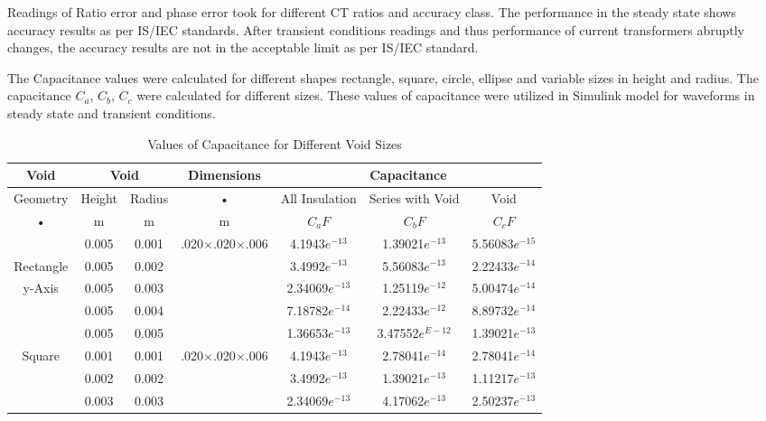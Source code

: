 Readings of Ratio error and phase error took for different CT ratios and accuracy class. The performance in the steady state shows accuracy results as per IS/IEC standards. After transient conditions readings and thus performance of current transformers abruptly changes, the accuracy results are not in the acceptable limit as per IS/IEC standard.

The Capacitance values were calculated for different shapes rectangle, square, circle, ellipse and variable sizes in height and radius. The capacitance $C_a$, $C_b$, $C_c$ were calculated for different sizes. These values of capacitance were utilized in Simulink model for waveforms in steady state and transient conditions.

\begin{table}[h!]
\caption{Values of Capacitance for Different Void Sizes}
\label{table:Values of Capacitance for Different Void Sizes}
\centering
\small
\begin{tabular}{|c|c|c|c|c|c|c|}
\hline 
Void & \multicolumn{2}{c|}{Void} & Dimensions & \multicolumn{3}{c|}{Capacitance}  \\ 
\hline 
Geometry & Height & Radius & • &  All Insulation & Series with Void & Void \\ 
• & m & m & m & $C_a F$ & $C_b F$ & $C_c F$ \\ \hline \hline 
			& 0.005 & 0.001 & .020$\times$.020$\times$.006  & 4.1943$e^{-13}$ & 1.39021$e^{-13}$ & 5.56083$e^{-15}$ \\ \cline{2-7}
Rectangle	& 0.005 & 0.002	& 								& 3.4992$e^{-13}$ & 5.56083$e^{-13}$ & 2.22433$e^{-14}$\\ \cline{2-7}
y-Axis		&0.005 & 0.003	&								& 2.34069$e^{-13}$ & 1.25119$e^{-12}$ & 5.00474$e^{-14}$ \\ \cline{2-7}
 			&0.005 & 0.004 	&								& 7.18782$e^{-14}$ & 2.22433$e^{-12}$ & 8.89732$e^{-14}$ \\ \cline{2-7}
 			&0.005 & 0.005 	& 								& 1.36653$e^{-13}$ & 3.47552$e^{E-12}$ & 1.39021$e^{-13}$ \\ \hline \hline		
\multirow{4}{*}{Square}&0.001 & 0.001& .020$\times$.020$\times$.006& 4.1943$e^{-13}$  & 2.78041$e^{-14}$ & 2.78041$e^{-14}$ \\ \cline{2-7}
 			&0.002&0.002	& 								& 3.4992$e^{-13}$  & 1.39021$e^{-13}$ &1.11217$e^{-13}$ \\ \cline{2-7}
 			&0.003&0.003	& 								& 2.34069$e^{-13}$ & 4.17062$e^{-13}$ &2.50237$e^{-13}$ \\ \cline{2-7}

\end{tabular}
\end{table}
